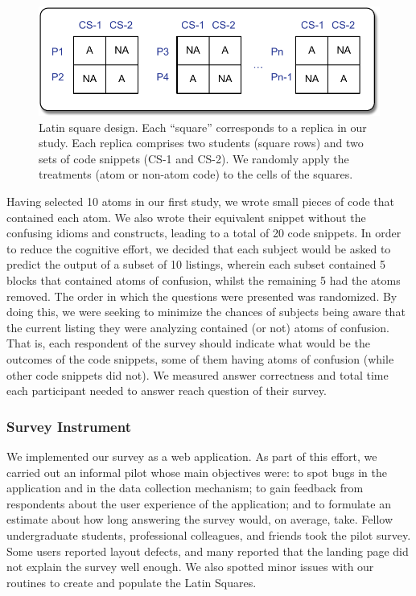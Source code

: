   \begin{figure}[htb!]
      \noindent
      \centering
      \includegraphics[scale=.50]{images/latin-square.pdf}
      \caption{Latin square design. Each ``square'' corresponds to 
      a replica in our study. Each replica comprises two students (square rows) 
      and two sets of code snippets (CS-1 and CS-2). We randomly apply the 
      treatments (atom or non-atom code) to the cells of the squares.} 
      \label{fig:latinsquare}
  \end{figure}


Having selected 10 atoms in our first study, we wrote small pieces of code that contained each atom. We also wrote their equivalent snippet without the confusing idioms and constructs, leading to a total of 20 code snippets. In order to reduce the cognitive effort, we decided that each subject would be asked to predict the output of a subset of 10 listings, wherein each subset contained 5 blocks that contained atoms of confusion, whilst the remaining 5 had the atoms removed. The order in which the questions were presented was randomized. By doing this, we were seeking to minimize the chances of subjects being aware that the current listing they were analyzing contained (or not) atoms of confusion.
That is, each respondent of the survey should indicate what would be the outcomes of the code snippets, some of them having atoms of confusion (while other code snippets did not). 
We measured answer correctness and total time each participant needed to answer reach question of their survey. 

\subsubsection{Survey Instrument} 

We implemented our survey as a web application. As part of this 
effort, we carried out an informal pilot whose main objectives were: to spot bugs in the application and in the data collection mechanism; to gain feedback from respondents about the user experience of the application; and to formulate an estimate about how long answering the survey would, on average, take. Fellow undergraduate students, professional colleagues, and friends took the pilot survey. Some users reported layout defects, and many reported that the landing page did not explain the survey well enough. We also spotted minor issues with our routines to create and populate the Latin Squares. 

